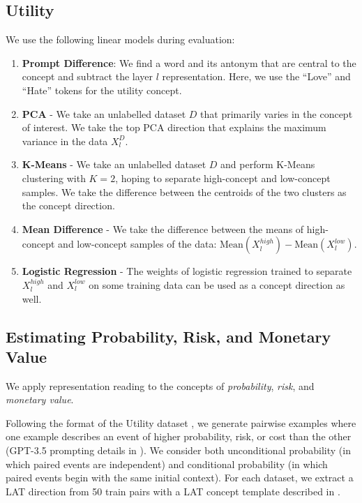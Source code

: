 \subsection{Utility}
\label{subsec:UtilityMethods}
We use the following linear models during evaluation:
\begin{enumerate}
    \item \textbf{Prompt Difference}: We find a word and its antonym that are central to the concept and subtract the layer $l$ representation. Here, we use the ``Love'' and ``Hate'' tokens for the utility concept.
    \item \textbf{PCA} - We take an unlabelled dataset $D$ that primarily varies in the concept of interest. We take the top PCA direction that explains the maximum variance in the data $X^D_l$.
    \item \textbf{K-Means} - We take an unlabelled dataset $D$ and perform K-Means clustering with $K=2$, hoping to separate high-concept and low-concept samples. We take the difference between the centroids of the two clusters as the concept direction. 
    \item \textbf{Mean Difference} - We take the difference between the means of high-concept and low-concept samples of the data: $\text{Mean}(X^{high}_l) - \text{Mean}(X^{low}_l)$.
    \item \textbf{Logistic Regression} - The weights of logistic regression trained to separate $X^{high}_l$ and $X^{low}_l$ on some training data can be used as a concept direction as well.
\end{enumerate}



\subsection{Estimating Probability, Risk, and Monetary Value}

\label{sec:probability}

We apply representation reading to the concepts of \textit{probability}, \textit{risk}, and \textit{monetary value}.

Following the format of the Utility dataset \citep{hendrycks2021aligning}, we generate pairwise examples where one example describes an event of higher probability, risk, or cost than the other (GPT-3.5 prompting details in ). 
We consider both unconditional probability (in which paired events are independent) and conditional probability (in which paired events begin with the same initial context). For each dataset, we extract a LAT direction from 50 train pairs with a LAT concept template described in .

